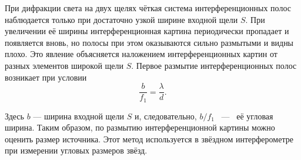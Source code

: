При дифракции света на двух щелях чёткая система 
интерференционных полос наблюдается только при достаточно узкой ширине входной
щели $S$. При увеличении её ширины интерференционная картина 
периодически пропадает и появляется вновь, но полосы при этом оказываются
сильно размытыми и видны плохо. Это явление объясняется 
наложением интерференционных картин от разных элементов широкой щели $S$.
Первое размытие интерференционных полос возникает при условии
\begin{equation}
  \frac{b}{f_1} =\frac{\lambda}{d}.
\end{equation}\label{eq:intblur}

Здесь $b$ — ширина входной щели
$S$ и, следовательно, $b/f_1$ ~---~ её угловая ширина.
Таким образом, по размытию интерференционной
картины
можно оценить размер источника. Этот метод используется в звёздном
интерферометре при измерении угловых размеров звёзд.